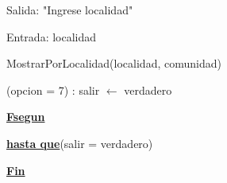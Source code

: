 \documentclass{article}
\begin{document}
        \hspace{16mm}Salida: "Ingrese localidad"

        \hspace{16mm}Entrada: localidad

        \hspace{16mm}MostrarPorLocalidad(localidad, comunidad)

    \hspace{12mm}(opcion = 7) : salir $\leftarrow$ verdadero

    \hspace{8mm}\underline{\textbf{Fsegun}}

    \hspace{4mm}\underline{\textbf{hasta que}}(salir = verdadero)



    \underline{\textbf{Fin}}
\end{document}
